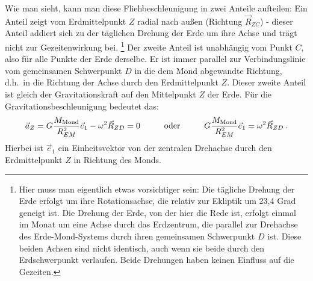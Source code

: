 Wie man sieht, kann man diese 
Fliehbeschleunigung in zwei Anteile aufteilen: Ein Anteil
zeigt vom Erdmittelpunkt $Z$ radial nach au\ss en (Richtung $\vec{R}_{ZC}$) - dieser Anteil addiert 
sich zu der t\"aglichen Drehung der Erde um ihre Achse und tr\"agt nicht zur Gezeitenwirkung 
bei.%
\footnote{Hier muss man eigentlich etwas vorsichtiger sein: Die t\"agliche Drehung der Erde erfolgt
um ihre Rotationsachse, die relativ zur Ekliptik um 23,4 Grad geneigt ist. Die Drehung der Erde, von
der hier die Rede ist, erfolgt einmal im Monat um eine Achse durch das Erdzentrum, die parallel zur
Drehachse des Erde-Mond-Systems durch ihren gemeinsamen Schwerpunkt $D$ ist. Diese beiden Achsen sind 
nicht identisch, auch wenn sie beide durch den Erdschwerpunkt verlaufen. Beide Drehungen haben
keinen Einfluss auf die Gezeiten.} %
Der zweite Anteil ist unabh\"angig vom Punkt $C$, also f\"ur alle Punkte der Erde
derselbe. Er ist immer parallel zur Verbindungslinie vom gemeinsamen Schwerpunkt $D$ in
die dem Mond abgewandte Richtung, d.h.\ in die Richtung der Achse durch den Erdmittelpunkt $Z$. 
Dieser zweite Anteil ist gleich der Gravitationskraft auf den Mittelpunkt $Z$ der Erde. F\"ur die
Gravitationsbeschleunigung bedeutet das:
\begin{equation}
\label{eq_aZ}
              \vec{a}_Z = G \frac{M_{\rm Mond}}{R_{EM}^2} \vec{e}_1 - \omega^2  \vec{R}_{ZD} = 0  \hspace{1cm} {\rm oder}
                  \hspace{1cm}    G \frac{M_{\rm Mond}}{R_{EM}^2} \vec{e}_1   = \omega^2  \vec{R}_{ZD}  \, .
\end{equation}
Hierbei ist $\vec{e}_1$ ein Einheitsvektor von der zentralen Drehachse durch den Erdmittelpunkt $Z$
in Richtung des Monds. 

